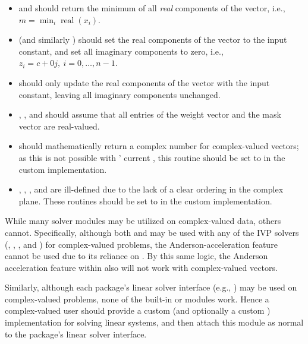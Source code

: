 \begin{itemize}
\item {} and  should return the minimum of
  all \emph{real} components of the vector, i.e.,  $m = \min_i
  \operatorname{real}(x_i) $. 

\item {} (and similarly ) should
  set the real components of the vector to the input constant, and set
  all imaginary components to zero, i.e., 
  $z_i = c + 0 j,\: i=0,\ldots,n-1$.

\item {} should only update the real components of the
  vector with the input constant, leaving all imaginary components
  unchanged.

\item {}, , 
  and  should assume that all entries of the
  weight vector  and the mask vector  are real-valued.
  
\item {} should mathematically return a complex number
  for complex-valued vectors; as this is not possible with
  {\sundials}' current , this routine should
  be set to  in the custom {\nvector} implementation.

\item {}, , ,
   and 
  are ill-defined due to the lack of a clear ordering in the
  complex plane.  These routines should be set to 
  in the custom {\nvector} implementation.
  
\end{itemize}

While many {\sundials} solver modules may be utilized on
complex-valued data, others cannot.  Specifically, although both
{\sunnonlinsolnewton} and {\sunnonlinsolfixedpoint} may be used with
any of the IVP solvers ({\cvode}, {\cvodes}, {\ida}, {\idas} and
{\arkode}) for complex-valued problems, the Anderson-acceleration
feature {\sunnonlinsolfixedpoint} cannot be used due to its reliance
on .  By this same logic, the Anderson acceleration
feature within {\kinsol} also will not work with complex-valued
vectors.

Similarly, although each package's linear solver interface (e.g.,
{\cvls}) may be used on complex-valued problems, none of the built-in
{\sunmatrix} or {\sunlinsol} modules work.  Hence a complex-valued
user should provide a custom {\sunlinsol} (and optionally a custom
{\sunmatrix}) implementation for solving linear systems, and then
attach this module as normal to the package's linear solver
interface. 

